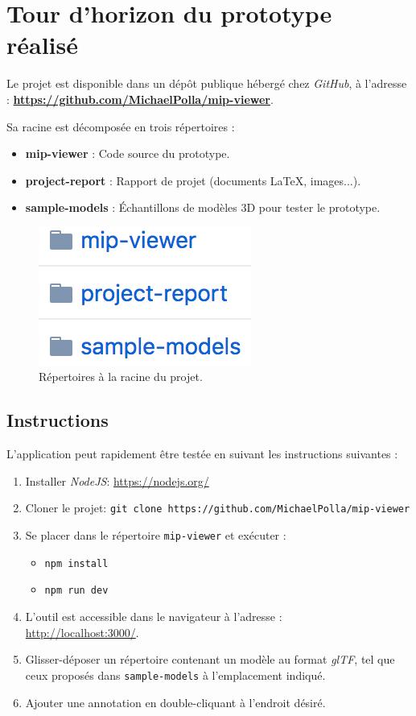 \chapter{Tour d'horizon du prototype réalisé}
\label{AppendixA}

Le projet est disponible dans un dépôt publique hébergé chez \textit{GitHub}, à l'adresse : \textbf{\url{https://github.com/MichaelPolla/mip-viewer}}.

Sa racine est décomposée en trois répertoires :

\begin{itemize}
    \item \textbf{mip-viewer} : Code source du prototype.
    \item \textbf{project-report} : Rapport de projet (documents \LaTeX, images...).
    \item \textbf{sample-models} : Échantillons de modèles 3D pour tester le prototype.
\end{itemize}

\begin{figure}[h]
    \centering
    \includegraphics[height=0.1\linewidth]{Figures/mip-viewer-root-folder.png}
    \caption{Répertoires à la racine du projet.}
    \label{fig:mip-viewer-root-folder}
\end{figure}

\section{Instructions}
L'application peut rapidement être testée en suivant les instructions suivantes :
\begin{enumerate}
    \item Installer \textit{NodeJS}: \url{https://nodejs.org/}
    \item Cloner le projet: \texttt{git clone https://github.com/MichaelPolla/mip-viewer}
    \item Se placer dans le répertoire \texttt{mip-viewer} et exécuter :
    \begin{itemize}
        \item \texttt{npm install}
        \item \texttt{npm run dev}
    \end{itemize}
    \item L'outil est accessible dans le navigateur à l'adresse : \\ \url{http://localhost:3000/}.
    \item Glisser-déposer un répertoire contenant un modèle au format \textit{glTF}, tel que ceux proposés dans \texttt{sample-models} à l'emplacement indiqué.
    \item Ajouter une annotation en double-cliquant à l'endroit désiré.
\end{enumerate}

